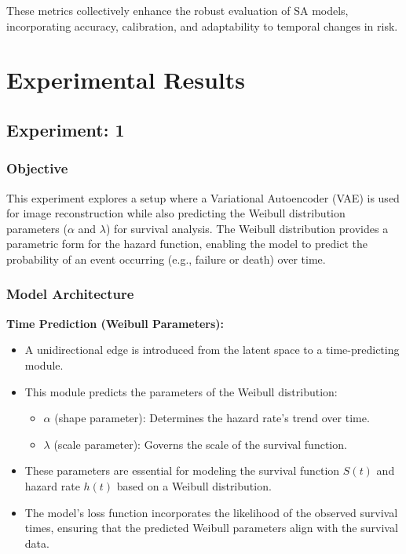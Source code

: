 \documentclass{article}
\begin{document}
These metrics collectively enhance the robust evaluation of SA models, incorporating accuracy, calibration, and adaptability to temporal changes in risk.

\section{Experimental Results}
\subsection{Experiment: 1}
\subsubsection{Objective}
This experiment explores a setup where a Variational Autoencoder (VAE) is used for image reconstruction while also predicting the Weibull distribution parameters ($\alpha$ and $\lambda$) for survival analysis. The Weibull distribution provides a parametric form for the hazard function, enabling the model to predict the probability of an event occurring (e.g., failure or death) over time.

\subsubsection{Model Architecture}
\textbf{Time Prediction (Weibull Parameters):}
\begin{itemize}
    \item A unidirectional edge is introduced from the latent space to a time-predicting module.
    \item This module predicts the parameters of the Weibull distribution:
    \begin{itemize}
        \item $\alpha$ (shape parameter): Determines the hazard rate's trend over time.
        \item $\lambda$ (scale parameter): Governs the scale of the survival function.
    \end{itemize}
    \item These parameters are essential for modeling the survival function $S(t)$ and hazard rate $h(t)$ based on a Weibull distribution.
    \item The model's loss function incorporates the likelihood of the observed survival times, ensuring that the predicted Weibull parameters align with the survival data.
\end{itemize}
\end{document}
